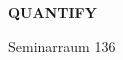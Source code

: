 \documentclass[a4paper]{article}
\begin{document}
\printGenericVSLHeader
\begin{center}
\begin{vsltext}{3cm}{4cm}

   \vspace{0.5cm} 

    \textbf{QUANTIFY} 

    \vspace{1.5cm}

    Seminarraum 136

\end{vsltext}

\end{center}
\end{document}
